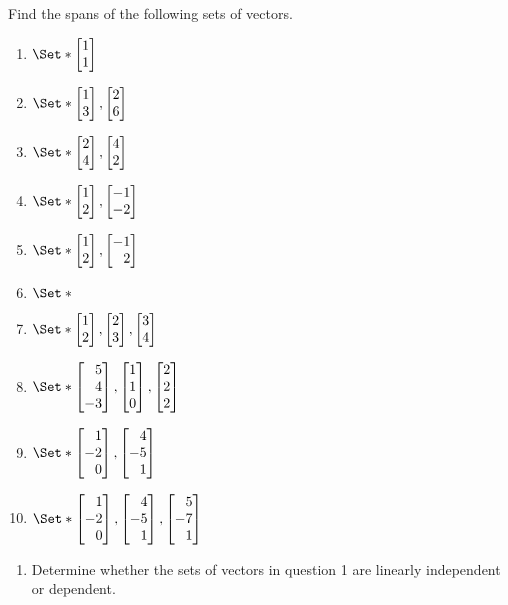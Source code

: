 \begin{exercises}
	\begin{problist}
		\prob
		Find the spans of the following sets of vectors.
		\begin{enumerate}
				\item   $\Set*{\mat{1\\1}}$ %
				\item   $\Set*{\mat{1\\3},\mat{2\\6}}$ %
				\item   $\Set*{\mat{2\\4},\mat{4\\2}}$ %
				\item   $\Set*{\mat{1\\2},\mat{-1\\-2}}$ %
				\item   $\Set*{\mat{1\\2},\mat{-1\\2}}$ %
				\item   $\Set*{}$
				\item		$\Set*{\mat{1\\2},\mat{2\\3},\mat{3\\4}}$ %
				\item   $\Set*{\mat{5\\4\\-3},\mat{1\\1\\0},\mat{2\\2\\2}}$ %
				\item   $\Set*{\mat{1\\-2\\0},\mat{4\\-5\\1}}$ %
				\item   $\Set*{\mat{1\\-2\\0},\mat{4\\-5\\1},\mat{5\\-7\\1}}$ %
		\end{enumerate}
		\prob
		\begin{enumerate}
			\item Determine whether the sets of vectors in question 1 are linearly
			independent or dependent.


\end{enumerate}
\end{problist}
\end{exercises}
